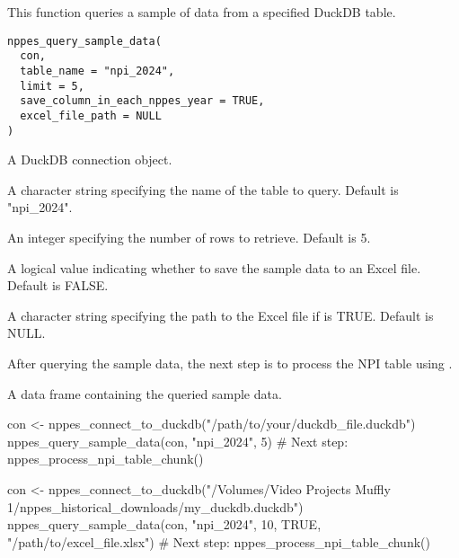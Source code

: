 \documentclass[a4paper]{book}
\begin{document}
%
\begin{Description}
This function queries a sample of data from a specified DuckDB table.
\end{Description}
%
\begin{Usage}
\begin{verbatim}
nppes_query_sample_data(
  con,
  table_name = "npi_2024",
  limit = 5,
  save_column_in_each_nppes_year = TRUE,
  excel_file_path = NULL
)
\end{verbatim}
\end{Usage}
%
\begin{Arguments}
\begin{ldescription}
\item[\code{con}] A DuckDB connection object.

\item[\code{table\_name}] A character string specifying the name of the table to query. Default is "npi\_2024".

\item[\code{limit}] An integer specifying the number of rows to retrieve. Default is 5.

\item[\code{save\_column\_in\_each\_nppes\_year}] A logical value indicating whether to save the sample data to an Excel file. Default is FALSE.

\item[\code{excel\_file\_path}] A character string specifying the path to the Excel file if  is TRUE. Default is NULL.
\end{ldescription}
\end{Arguments}
%
\begin{Details}
After querying the sample data, the next step is to process the NPI table using .
\end{Details}
%
\begin{Value}
A data frame containing the queried sample data.
\end{Value}
%
\begin{Examples}
\begin{ExampleCode}
con <- nppes_connect_to_duckdb("/path/to/your/duckdb_file.duckdb")
nppes_query_sample_data(con, "npi_2024", 5)
# Next step: nppes_process_npi_table_chunk()

con <- nppes_connect_to_duckdb("/Volumes/Video Projects Muffly 1/nppes_historical_downloads/my_duckdb.duckdb")
nppes_query_sample_data(con, "npi_2024", 10, TRUE, "/path/to/excel_file.xlsx")
# Next step: nppes_process_npi_table_chunk()
\end{ExampleCode}
\end{Examples}
\end{document}
